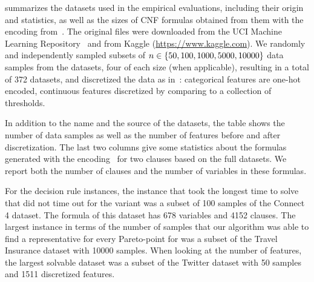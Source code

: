 
 summarizes the datasets used in the empirical evaluations, including their origin and statistics, as well as the sizes of CNF formulas obtained from them with the encoding from~\textcite{DBLP:conf/cp/MaliotovM18}.
The original files were downloaded from the UCI Machine Learning Repository~\autocite{UciMlr} and from Kaggle ({\small\url{https://www.kaggle.com}}).
We randomly and independently sampled subsets of $n\in\{50,100,1000,5000,10000\}$ data samples from the datasets, four of each size (when applicable), resulting in a         
total of 372 datasets, and discretized the data as in~\autocite{DBLP:conf/cp/MaliotovM18}:
categorical features are one-hot encoded, continuous features discretized by comparing to a collection of thresholds. 

In addition to the name and the source of the datasets, the table shows the number of data samples as well as the number of features before and after discretization.
The last two columns give some statistics about the formulas generated with the encoding~\autocite{DBLP:conf/cp/MaliotovM18} for two clauses based on the full datasets.
We report both the number of clauses and the number of variables in these formulas.

For the decision rule instances, the instance that took the longest time to solve that did not time out for the \msh{} variant was a subset of 100 samples of the Connect 4 dataset.
The formula of this dataset has 678 variables and 4152 clauses.
The largest instance in terms of the number of samples that our algorithm was able to find a representative for every Pareto-point for was a subset of the Travel Insurance dataset with 10000 samples.
When looking at the number of features, the largest solvable dataset was a subset of the Twitter dataset with 50 samples and 1511 discretized features.

